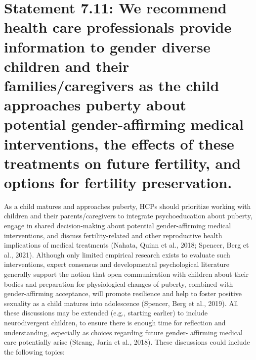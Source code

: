 \documentclass[
]{book}
\begin{document}
\hypertarget{statement-7.11-we-recommend-health-care-professionals-provide-information-to-gender-diverse-children-and-their-familiescaregivers-as-the-child-approaches-puberty-about-potential-gender-affirming-medical-interventions-the-effects-of-these-treatments-on-future-fertility-and-options-for-fertility-preservation.}{%
\section*{Statement 7.11: We recommend health care professionals provide information to gender diverse children and their families/caregivers as the child approaches puberty about potential gender-affirming medical interventions, the effects of these treatments on future fertility, and options for fertility preservation.}\label{statement-7.11-we-recommend-health-care-professionals-provide-information-to-gender-diverse-children-and-their-familiescaregivers-as-the-child-approaches-puberty-about-potential-gender-affirming-medical-interventions-the-effects-of-these-treatments-on-future-fertility-and-options-for-fertility-preservation.}}

As a child matures and approaches puberty,
HCPs should prioritize working with children and
their parents/caregivers to integrate psychoeducation about puberty, engage in shared
decision-making about potential gender-affirming
medical interventions, and discuss fertility-related
and other reproductive health implications of
medical treatments (Nahata, Quinn et al., 2018;
Spencer, Berg et al., 2021). Although only limited
empirical research exists to evaluate such interventions, expert consensus and developmental
psychological literature generally support the
notion that open communication with children
about their bodies and preparation for physiological changes of puberty, combined with
gender-affirming acceptance, will promote resilience and help to foster positive sexuality as a
child matures into adolescence (Spencer, Berg
et al., 2019). All these discussions may be extended
(e.g., starting earlier) to include neurodivergent
children, to ensure there is enough time for
reflection and understanding, especially as choices
regarding future gender- affirming medical care
potentially arise (Strang, Jarin et al., 2018). These
discussions could include the following topics:
\end{document}
